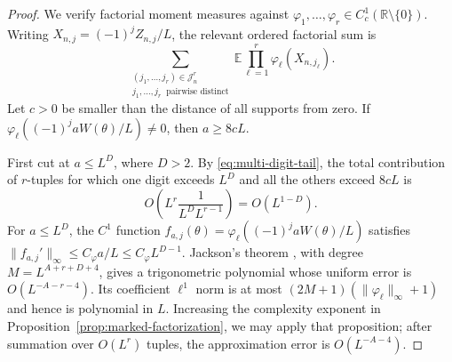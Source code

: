 \documentclass[11pt,a4paper]{amsart}
\theoremstyle{definition}
\theoremstyle{remark}
\newcommand{\R}{\mathbb R}
\newcommand{\E}{\mathbb E}
\begin{document}
\begin{proof}
We verify factorial moment measures against
$\varphi_1,\ldots,\varphi_r\in C_c^1(\R\setminus\{0\})$.
Writing $X_{n,j}=(-1)^jZ_{n,j}/L$, the relevant ordered factorial sum is
\begin{equation}\label{eq:ordered-factorial-sum}
 \sum_{\substack{(j_1,\ldots,j_r)\in\mathcal J_n^r\\
                  j_1,\ldots,j_r\ \text{ pairwise distinct}}}
 \E\prod_{\ell=1}^r\varphi_\ell(X_{n,j_\ell}).
\end{equation}
Let $c>0$ be smaller than the distance of all supports from zero.  If
$\varphi_\ell((-1)^jaW(\theta)/L)\ne0$, then $a\ge8cL$.

First cut at $a\le L^D$, where $D>2$.  By
\eqref{eq:multi-digit-tail}, the total contribution of $r$-tuples for which
one digit exceeds $L^D$ and all the others exceed $8cL$ is
\[
 O\left(L^r\frac1{L^D L^{r-1}}\right)=O(L^{1-D}).
\]
For $a\le L^D$, the $C^1$ function
$f_{a,j}(\theta)=\varphi_\ell((-1)^jaW(\theta)/L)$ satisfies
$\|f_{a,j}'\|_\infty\le C_\varphi a/L\le C_\varphi L^{D-1}$.
Jackson's theorem \cite[Chap.~X]{Zygmund59}, with degree
$M=L^{A+r+D+4}$, gives a trigonometric
polynomial whose uniform error is $O(L^{-A-r-4})$.  Its coefficient
$\ell^1$ norm is at most
$(2M+1)(\|\varphi_\ell\|_\infty+1)$ and hence is polynomial in $L$.
Increasing the complexity exponent in
Proposition~\ref{prop:marked-factorization}, we may apply that proposition;
after summation over $O(L^r)$ tuples, the approximation error is
$O(L^{-A-4})$.


\end{proof}
\end{document}
